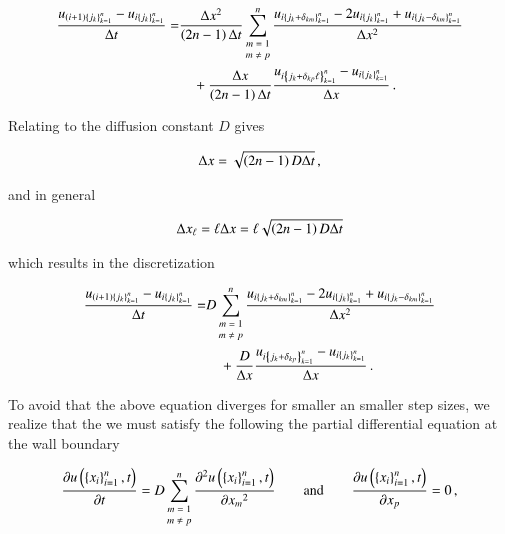 \documentclass[11pt,english,a4paper]{article}
\begin{document}
\begin{flushleft}
\begin{align*}
\frac{u_{(i+1)\left\lbrace{j_k}\right\rbrace_{k=1}^n}-u_{i\left\lbrace{j_k}\right\rbrace_{k=1}^n}}{\Delta t} =& \frac{\Delta x^2}{\left({2n-1}\right)\Delta t}\sum_{\scriptsize\begin{matrix}m=1\\ m\neq p\end{matrix}}^n\frac{u_{i\left\lbrace{j_k+\delta_{km}}\right\rbrace_{k=1}^n} - 2 u_{i\left\lbrace{j_k}\right\rbrace_{k=1}^n} + u_{i\left\lbrace{j_k-\delta_{km}}\right\rbrace_{k=1}^n}}{\Delta x^2} 
\\&\quad + \frac{\Delta x}{\left({2n-1}\right)\Delta t} \frac{u_{i\left\lbrace{j_k+\delta_{kp}\ell}\right\rbrace_{k=1}^n} - u_{i\left\lbrace{j_k}\right\rbrace_{k=1}^n}}{\Delta x} \,.
\end{align*}

Relating to the diffusion constant $D$ gives

\begin{align}
\Delta x = \sqrt{\left({2n-1}\right)D\Delta t} \,,
\label{eq_51}
\end{align}

and in general

\begin{align}
\Delta x_\ell = \ell \Delta x = \ell\sqrt{\left({2n-1}\right)D\Delta t}
\label{eq_52}
\end{align}

which results in the discretization

\begin{align*}
\frac{u_{(i+1)\left\lbrace{j_k}\right\rbrace_{k=1}^n}-u_{i\left\lbrace{j_k}\right\rbrace_{k=1}^n}}{\Delta t} =& D\sum_{\scriptsize\begin{matrix}m=1\\ m\neq p\end{matrix}}^n\frac{u_{i\left\lbrace{j_k+\delta_{km}}\right\rbrace_{k=1}^n} - 2 u_{i\left\lbrace{j_k}\right\rbrace_{k=1}^n} + u_{i\left\lbrace{j_k-\delta_{km}}\right\rbrace_{k=1}^n}}{\Delta x^2} 
\\&\quad + \frac{D}{\Delta x} \frac{u_{i\left\lbrace{j_k+\delta_{kp}}\right\rbrace_{k=1}^n} - u_{i\left\lbrace{j_k}\right\rbrace_{k=1}^n}}{\Delta x} \,.
\end{align*}

To avoid that the above equation diverges for smaller an smaller step sizes, we realize that the we must satisfy the following the partial differential equation at the wall boundary

\begin{align}
\frac{\partial u\left({\left\lbrace{x_i}\right\rbrace_{i=1}^n, t}\right)}{\partial t} = D\sum_{\scriptsize\begin{matrix}m=1\\ m\neq p\end{matrix}}^n \frac{\partial^2 u\left({\left\lbrace{x_i}\right\rbrace_{i=1}^n, t}\right)}{\partial {x_m}^2} \qquad \text{and} \qquad \frac{\partial u\left({\left\lbrace{x_i}\right\rbrace_{i=1}^n, t}\right)}{\partial x_p} = 0 \,,
\label{eq_53}
\end{align}


\end{flushleft}
\end{document}
